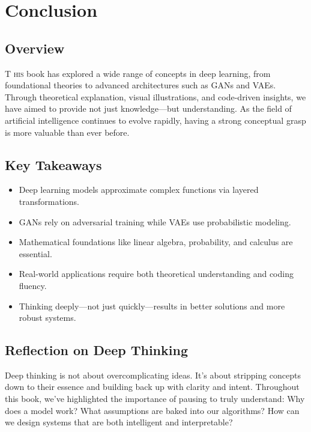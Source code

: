 \documentclass{book}
\begin{document}
\chapter{Conclusion}
\begin{multicols}{2}

\section*{Overview}
\lettrine{T}{ his} book has explored a wide range of concepts in deep learning, from foundational theories to advanced architectures such as GANs and VAEs. Through theoretical explanation, visual illustrations, and code-driven insights, we have aimed to provide not just knowledge—but understanding. As the field of artificial intelligence continues to evolve rapidly, having a strong conceptual grasp is more valuable than ever before.

\section*{Key Takeaways}
\begin{itemize}
  \item Deep learning models approximate complex functions via layered transformations.
  \item GANs rely on adversarial training while VAEs use probabilistic modeling.
  \item Mathematical foundations like linear algebra, probability, and calculus are essential.
  \item Real-world applications require both theoretical understanding and coding fluency.
  \item Thinking deeply—not just quickly—results in better solutions and more robust systems.
\end{itemize}

\section*{Reflection on Deep Thinking}
Deep thinking is not about overcomplicating ideas. It’s about stripping concepts down to their essence and building back up with clarity and intent. Throughout this book, we’ve highlighted the importance of pausing to truly understand: Why does a model work? What assumptions are baked into our algorithms? How can we design systems that are both intelligent and interpretable?


\end{multicols}
\end{document}
